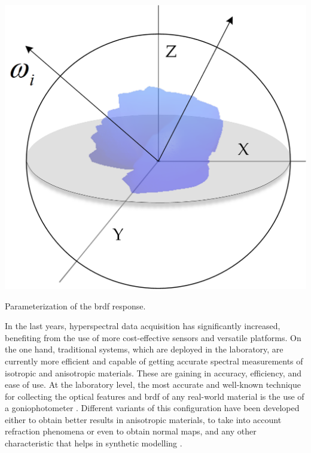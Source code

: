 \begin{marginfigure}[-1.2cm]
	\includegraphics{figs/fundamentals/brdf_wi_wo.png}
	\caption{Parameterization of the \acrshort{brdf} response.}
	\label{fig:brdf_wi_wo}
\end{marginfigure}

In the last years, hyperspectral data acquisition has significantly increased, benefiting from the use of more cost-effective sensors and versatile platforms. On the one hand, traditional systems, which are deployed in the laboratory, are currently more efficient and capable of getting accurate spectral measurements of isotropic and anisotropic materials. These are gaining in accuracy, efficiency, and ease of use. At the laboratory level, the most accurate and well-known technique for collecting the optical features and \acrshort{brdf} of any real-world material is the use of a goniophotometer \cite{riviere_multispectral_2012}. Different variants of this configuration have been developed either to obtain better results in anisotropic materials, to take into account refraction phenomena or even to obtain normal maps, and any other characteristic that helps in synthetic modelling \cite{tunwattanapong_acquiring_2013, chen_reflectance_2014}. 

